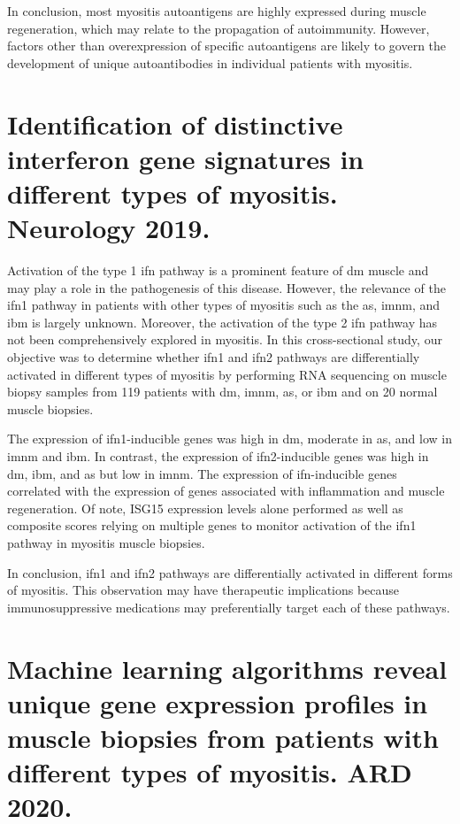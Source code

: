 In conclusion, most myositis autoantigens are highly expressed during muscle regeneration, which may relate to the propagation of autoimmunity. However, factors other than overexpression of specific autoantigens are likely to govern the development of unique autoantibodies in individual patients with myositis.


{\cleardoublepage}

\section{Identification of distinctive interferon gene signatures in different types of myositis. Neurology 2019.}
\label{sec:ifn}

Activation of the type 1 \gls{ifn} pathway is a prominent feature of \gls{dm} muscle and may play a role in the pathogenesis of this disease. However, the relevance of the \gls{ifn}1 pathway in patients with other types of myositis such as the \gls{as}, \gls{imnm}, and \gls{ibm} is largely unknown. Moreover, the activation of the type 2 \gls{ifn} pathway has not been comprehensively explored in myositis. In this cross-sectional study, our objective was to determine whether \gls{ifn}1 and \gls{ifn}2 pathways are differentially activated in different types of myositis by performing RNA sequencing on muscle biopsy samples from 119 patients with \gls{dm}, \gls{imnm}, \gls{as}, or \gls{ibm} and on 20 normal muscle biopsies.

The expression of \gls{ifn}1-inducible genes was high in \gls{dm}, moderate in \gls{as}, and low in \gls{imnm} and \gls{ibm}. In contrast, the expression of \gls{ifn}2-inducible genes was high in \gls{dm}, \gls{ibm}, and \gls{as} but low in \gls{imnm}. The expression of \gls{ifn}-inducible genes correlated with the expression of genes associated with inflammation and muscle regeneration. Of note, ISG15 expression levels alone performed as well as composite scores relying on multiple genes to monitor activation of the \gls{ifn}1 pathway in myositis muscle biopsies.

In conclusion, \gls{ifn}1 and \gls{ifn}2 pathways are differentially activated in different forms of myositis. This observation may have therapeutic implications because immunosuppressive medications may preferentially target each of these pathways.


{\cleardoublepage}

\section{Machine learning algorithms reveal unique gene expression profiles in muscle biopsies from patients with different types of myositis. ARD 2020.}
\label{sec:rnaseq_ml}

